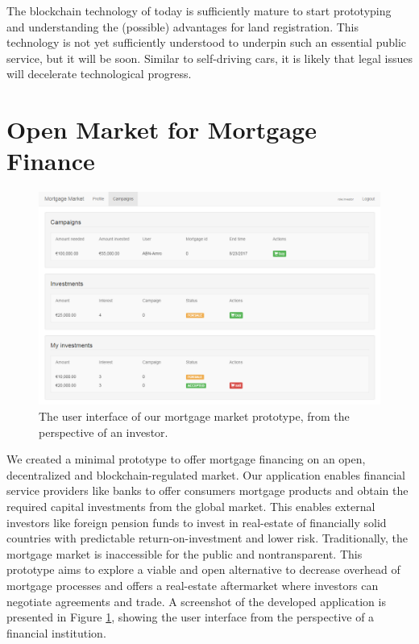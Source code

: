 \documentclass[USenglish]{article}
\begin{document}
The blockchain technology of today is sufficiently mature to start prototyping and understanding the (possible) advantages for land registration. 
This technology is not yet sufficiently understood to underpin such an essential public service, but it will be soon.
Similar to self-driving cars, it is likely that legal issues will decelerate technological progress.

\section{Open Market for Mortgage Finance}

\begin{figure}[t]
	\centering
	\includegraphics[width=1\columnwidth]{assets/mortgagemarket}
	\caption{The user interface of our mortgage market prototype, from the perspective of an investor.}
	\label{fig:mortgage_market_interface}
\end{figure}

We created a minimal prototype to offer mortgage financing on an open, decentralized and blockchain-regulated market.
Our application enables financial service providers like banks to offer consumers mortgage products and obtain the required capital investments from the global market.
This enables external investors like foreign pension funds to invest in real-estate of financially solid countries with predictable return-on-investment and lower risk.
Traditionally, the mortgage market is inaccessible for the public and nontransparent.
This prototype aims to explore a viable and open alternative to decrease overhead of mortgage processes and offers a real-estate aftermarket where investors can negotiate agreements and trade.
A screenshot of the developed application is presented in Figure \ref{fig:mortgage_market_interface}, showing the user interface from the perspective of a financial institution.
\end{document}
